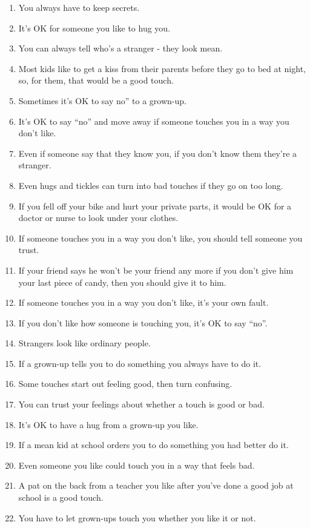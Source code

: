 \begin{anexosenv}
\begin{enumerate}
	\item You always have to keep secrets.
	\item It's OK for someone you like to hug you.
	\item You can always tell who's a stranger - they look mean.
	\item Most kids like to get a kiss from their parents before they go to bed at night, so, for them, that would be a good touch.
	\item Sometimes it's OK to say no'' to a grown-up.
	\item It's OK to say ``no'' and move away if someone touches you in a way you don't like.
	\item Even if someone say that they know you, if you don't know them they're a stranger.
	\item Even hugs and tickles can turn into bad touches if they go on too long.
	\item If you fell off your bike and hurt your private parts, it would be OK for a doctor or nurse to look under your clothes.
	\item If someone touches you in a way you don't like, you should tell someone you trust.
	\item If your friend says he won't be your friend any more if you don't give him your last piece of candy, then you should give it to him.
	\item If someone touches you in a way you don't like, it's your own fault.
	\item If you don't like how someone is touching you, it's OK to say ``no''.
	\item Strangers look like ordinary people.
	\item If a grown-up tells you to do something you always have to do it.
	\item Some touches start out feeling good, then turn confusing.
	\item You can trust your feelings about whether a touch is good or bad.
	\item It's OK to have a hug from a grown-up you like.
	\item If a mean kid at school orders you to do something you had better do it.
	\item Even someone you like could touch you in a way that feels bad.
	\item A pat on the back from a teacher you like after you've done a good job at school is a good touch.
	\item You have to let grown-ups touch you whether you like it or not.

\end{enumerate}
\end{anexosenv}
